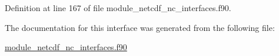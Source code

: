 Definition at line 167 of file module\+\_\+netcdf\+\_\+nc\+\_\+interfaces.\+f90.



The documentation for this interface was generated from the following file\+:\begin{DoxyCompactItemize}
\item 
\hyperlink{module__netcdf__nc__interfaces_8f90}{module\+\_\+netcdf\+\_\+nc\+\_\+interfaces.\+f90}\end{DoxyCompactItemize}
